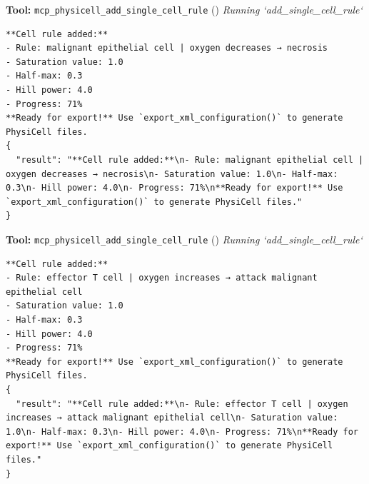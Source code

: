 \documentclass[11pt,a4paper]{article}
\begin{document}
\begin{toolokbox}
\textbf{Tool:} \texttt{mcp\_physicell\_add\_single\_cell\_rule} (\checkmark)
\textit{Running `add\_single\_cell\_rule`}
\begin{lstlisting}
**Cell rule added:**
- Rule: malignant epithelial cell | oxygen decreases → necrosis
- Saturation value: 1.0
- Half-max: 0.3
- Hill power: 4.0
- Progress: 71%
**Ready for export!** Use `export_xml_configuration()` to generate PhysiCell files.
{
  "result": "**Cell rule added:**\n- Rule: malignant epithelial cell | oxygen decreases → necrosis\n- Saturation value: 1.0\n- Half-max: 0.3\n- Hill power: 4.0\n- Progress: 71%\n**Ready for export!** Use `export_xml_configuration()` to generate PhysiCell files."
}
\end{lstlisting}
\end{toolokbox}
\begin{toolokbox}
\textbf{Tool:} \texttt{mcp\_physicell\_add\_single\_cell\_rule} (\checkmark)
\textit{Running `add\_single\_cell\_rule`}
\begin{lstlisting}
**Cell rule added:**
- Rule: effector T cell | oxygen increases → attack malignant epithelial cell
- Saturation value: 1.0
- Half-max: 0.3
- Hill power: 4.0
- Progress: 71%
**Ready for export!** Use `export_xml_configuration()` to generate PhysiCell files.
{
  "result": "**Cell rule added:**\n- Rule: effector T cell | oxygen increases → attack malignant epithelial cell\n- Saturation value: 1.0\n- Half-max: 0.3\n- Hill power: 4.0\n- Progress: 71%\n**Ready for export!** Use `export_xml_configuration()` to generate PhysiCell files."
}
\end{lstlisting}
\end{toolokbox}
\end{document}
